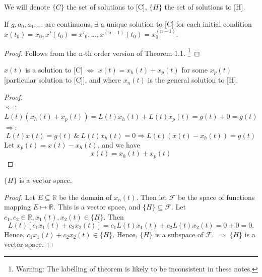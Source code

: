 \documentclass[twoside]{article}
\begin{document}
\begin{remark}
    We will denote $\{C\}$ the set of solutions to [C], $\{H\}$ the set of solutions to [H].
\end{remark}

\begin{theorem}
    If $g, a_0, a_1, ...$ are continuous, $\exists$ a unique solution to [C] for each initial condition $x(t_0) = x_0, x'(t_0) = x'_0, ..., x^{(n-1)}(t_0) = x^{(n-1)}_0$.
\end{theorem}
\begin{proof}
    Follows from the n-th order version of Theorem 1.1.
    \footnote{Warning: The labelling of theorem is likely to be inconsistent in these notes.}
\end{proof}

\begin{theorem}
    $x(t)$ is a solution to [C]
    $\iff$ $x(t) = x_h(t) + x_p(t) $ for some $x_p(t)$ [particular solution to [C]], and where $x_n(t)$ is the general solution to [H].
\end{theorem}
\begin{proof}~\\
    $\Longleftarrow$:
    \begin{equation}
        L(t)(x_h(t)+x_p(t)) = L(t)x_h(t)+L(t) x_p(t) = g(t) + 0 = g(t)
    \end{equation}
    $\Longrightarrow$:
    \begin{equation}
        L(t)x(t) = g(t) ~\&~ L(t)x_h(t) = 0 \Longrightarrow L(t)(x(t) - x_h(t)) = g(t)
    \end{equation}
    Let $x_p(t) = x(t) - x_h(t)$, and we have
    \begin{equation}
        x(t) = x_h(t) + x_p(t)
    \end{equation}
\end{proof}

\begin{theorem}
    $\{H\}$ is a vector space.    
\end{theorem}
\begin{proof}
    Let $E\subseteq \mathbb{R}$ be the domain of $x_n(t)$. Then let $\mathcal{F}$ be the space of functions mapping $E \mapsto \mathbb{R}$. This is a vector space, and $\{H\} \subseteq \mathcal{F}$. Let $c_1,c_2 \in \mathbb{R}, x_1(t), x_2(t) \in \{H\}$. Then
    \begin{equation}
        L(t)[c_1x_1(t)+c_2x_2(t)] = c_1L(t)x_1(t)+c_2L(t)x_2(t) = 0 + 0 = 0.
    \end{equation}
    Hence, $c_1x_1(t)+c_2x_2(t) \in \{H\}$. Hence, $\{H\}$ is a subspace of $\mathcal{F}$. $\Longrightarrow$ $\{H\}$ is a vector space.
\end{proof}
\end{document}
